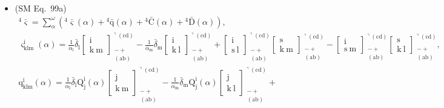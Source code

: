 \documentclass[
    12pt,              %
    a4paper,           %
    headings=normal,   %
    twoside=true,      %
    BCOR=8mm,          %
]{scrbook}
\begin{document}
\begin{itemize}[label={},leftmargin=0pt]
    \item (SM Eq.\ 99a) 
    \[
    \begin{gathered}
    {}^4\bar{\bm{\varsigma}} = \sum_\alpha^\omega \left( {}^4\bar{\bm{\varsigma}}(\alpha) + {}^4\bar{\mathrm{q}}(\alpha) + {}^4\bar{\mathrm{C}}(\alpha) + {}^4\bar{\mathrm{D}}(\alpha) \right), \\
    \varsigma^\mathrm{i}_{\mathrm{klm}}(\alpha) = \frac{1}{\alpha_\mathrm{l}}\bar{\delta}_\mathrm{l} \left[ \begin{smallmatrix} \mathrm{i} \\ \mathrm{k\ m} \end{smallmatrix} \right]^{\urcorner(\mathrm{cd})}_{\substack{- + \\ (\mathrm{ab})}} - \frac{1}{\alpha_\mathrm{m}}\bar{\delta}_\mathrm{m} \left[ \begin{smallmatrix} \mathrm{i} \\ \mathrm{k\ l} \end{smallmatrix} \right]^{\urcorner(\mathrm{cd})}_{\substack{- + \\ (\mathrm{ab})}} + \left[ \begin{smallmatrix} \mathrm{i} \\ \mathrm{s\ l} \end{smallmatrix} \right]^{\urcorner(\mathrm{cd})}_{\substack{- + \\ (\mathrm{ab})}} \left[ \begin{smallmatrix} \mathrm{s} \\ \mathrm{k\ m} \end{smallmatrix} \right]^{\urcorner(\mathrm{cd})}_{\substack{- + \\ (\mathrm{ab})}} - \left[ \begin{smallmatrix} \mathrm{i} \\ \mathrm{s\ m} \end{smallmatrix} \right]^{\urcorner(\mathrm{cd})}_{\substack{- + \\ (\mathrm{ab})}} \left[ \begin{smallmatrix} \mathrm{s} \\ \mathrm{k\ l} \end{smallmatrix} \right]^{\urcorner(\mathrm{cd})}_{\substack{- + \\ (\mathrm{ab})}}, \\
    \mathrm{q}^\mathrm{i}_{\mathrm{klm}}(\alpha) = \frac{1}{\alpha_\mathrm{l}}\bar{\delta}_\mathrm{l} \mathrm{Q}^\mathrm{i}_\mathrm{j}(\alpha) \left[ \begin{smallmatrix} \mathrm{j} \\ \mathrm{k\ m} \end{smallmatrix} \right]^{\urcorner(\mathrm{cd})}_{\substack{- + \\ (\mathrm{ab})}} - \frac{1}{\alpha_\mathrm{m}}\bar{\delta}_\mathrm{m} \mathrm{Q}^\mathrm{i}_\mathrm{j}(\alpha) \left[ \begin{smallmatrix} \mathrm{j} \\ \mathrm{k\ l} \end{smallmatrix} \right]^{\urcorner(\mathrm{cd})}_{\substack{- + \\ (\mathrm{ab})}} + \\

\end{gathered}\]
\end{itemize}
\end{document}
